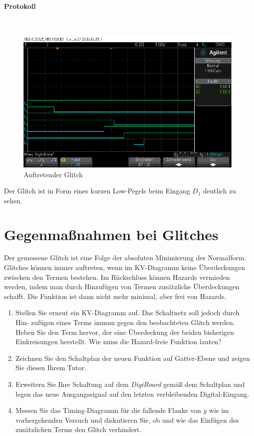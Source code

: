 \documentclass[10pt]{scrreprt}
\begin{document}
    \paragraph{Protokoll}
    $ $
    \begin{figure}[H]
        \includegraphics[width=\textwidth]{scope_12.png}
        \caption{Auftretender Glitch}
    \end{figure}

    Der Glitch ist in Form eines kurzen Low-Pegels beim Eingang $D_1$ deutlich
    zu sehen.

    \section{Gegenmaßnahmen bei Glitches}
    Der gemessene Glitch ist eine Folge der absoluten Minimierung der Normalform. Glitches
    können immer auftreten, wenn im KV-Diagramm keine Überdeckungen zwischen den
    Termen bestehen. Im Rückschluss können Hazards vermieden werden, indem man durch
    Hinzufügen von Termen zusätzliche Überdeckungen schafft. Die Funktion ist dann nicht
    mehr minimal, aber frei von Hazards.

    \begin{enumerate}
        \item Stellen Sie erneut ein KV-Diagramm auf. Das Schaltnetz soll jedoch durch Hin-
            zufügen eines Terms immun gegen den beobachteten Glitch werden. Heben Sie den
            Term hervor, der eine Überdeckung der beiden bisherigen Einkreisungen herstellt.
            Wie muss die Hazard-freie Funktion lauten?
        \item Zeichnen Sie den Schaltplan der neuen Funktion auf Gatter-Ebene und zeigen Sie
            diesen Ihrem Tutor.
        \item Erweitern Sie Ihre Schaltung auf dem \textit{DigiBoard} gemäß dem Schaltplan und legen
            das neue Ausgangssignal auf den letzten verbleibenden Digital-Eingang.
        \item Messen Sie das Timing-Diagramm für die fallende Flanke von $y$ wie im vorhergehenden
            Versuch und diskutieren Sie, ob und wie das Einfügen des zusätzlichen Terms
            den Glitch verhindert.
    \end{enumerate}
\end{document}
